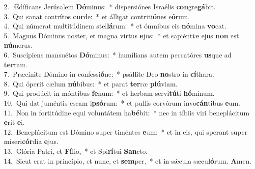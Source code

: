 {2.~}Ædíficans Jerúsalem \textbf{Dó}minus:~* dispersiónes Israélis \textbf{con}gre\textbf{gá}bit.\\
{3.~}Qui sanat contrítos \textbf{cor}de:~* et álligat contriti\textbf{ó}nes e\textbf{ó}rum.\\
{4.~}Qui númerat multitúdinem stel\textbf{lá}rum:~* et ómnibus eis \textbf{nó}mina \textbf{vo}cat.\\
{5.~}Magnus Dóminus noster, et magna virtus \textbf{e}jus:~* et sapiéntiæ ejus \textbf{non} est \textbf{nú}merus.\\
{6.~}Suscípiens mansuétos \textbf{Dó}minus:~* humílians autem peccatóres \textbf{us}que ad \textbf{ter}ram.\\
{7.~}Præcínite Dómino in confessi\textbf{ó}ne:~* psállite Deo \textbf{no}stro in \textbf{cí}thara.\\
{8.~}Qui óperit cælum \textbf{nú}bibus:~* et parat \textbf{ter}ræ \textbf{plú}viam.\\
{9.~}Qui prodúcit in móntibus \textbf{fe}num:~* et herbam servi\textbf{tú}ti \textbf{hó}minum.\\
{10.~}Qui dat juméntis escam i\textbf{psó}rum:~* et pullis corvórum invo\textbf{cán}tibus \textbf{e}um.\\
{11.~}Non in fortitúdine equi voluntátem ha\textbf{bé}bit:~* nec in tíbiis viri beneplácitum \textbf{e}rit \textbf{e}i.\\
{12.~}Beneplácitum est Dómino super timéntes \textbf{e}um:~* et in eis, qui sperant super miseri\textbf{cór}dia \textbf{e}jus.\\
{13.~}Glória Patri, et \textbf{Fí}lio,~* et Spi\textbf{rí}tui \textbf{San}cto.\\
{14.~}Sicut erat in princípio, et nunc, et \textbf{sem}per,~* et in sǽcula sæcu\textbf{ló}rum. \textbf{A}men.\\
